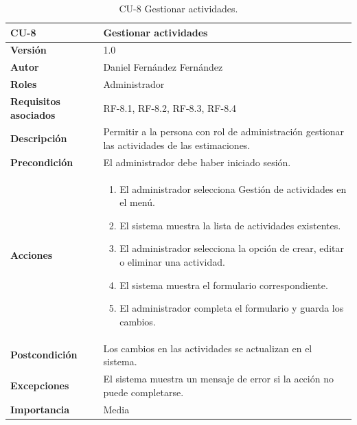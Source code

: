 \begin{table}[p]
        \centering
        \begin{tabularx}{\linewidth}{ p{} p{} }
            \toprule
            \textbf{CU-8} & \textbf{Gestionar actividades}\\
            \toprule
            \textbf{Versión} & 1.0 \\
            \textbf{Autor} & Daniel Fernández Fernández \\
            \textbf{Roles} & Administrador \\
            \textbf{Requisitos asociados} & RF-8.1, RF-8.2, RF-8.3, RF-8.4 \\
            \textbf{Descripción} & Permitir a la persona con rol de administración gestionar las actividades de las estimaciones. \\
            \textbf{Precondición} & El administrador debe haber iniciado sesión. \\
            \textbf{Acciones} &
            \begin{enumerate}
            \def\labelenumi{\arabic{enumi}.}
            \tightlist
            \item El administrador selecciona Gestión de actividades en el menú.
            \item El sistema muestra la lista de actividades existentes.
            \item El administrador selecciona la opción de crear, editar o eliminar una actividad.
            \item El sistema muestra el formulario correspondiente.
            \item El administrador completa el formulario y guarda los cambios.
            \end{enumerate}\\
            \textbf{Postcondición} & Los cambios en las actividades se actualizan en el sistema. \\
            \textbf{Excepciones} & El sistema muestra un mensaje de error si la acción no puede completarse. \\
            \textbf{Importancia} & Media \\
            \bottomrule
        \end{tabularx}
        \caption{CU-8 Gestionar actividades.}
\end{table}

